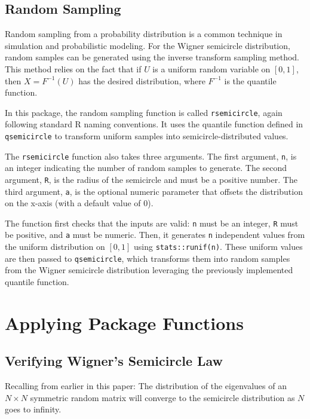\documentclass[11pt]{asaproc}
\begin{document}
\subsection{Random Sampling}

Random sampling from a probability distribution is a common technique in simulation and probabilistic modeling. For the Wigner semicircle distribution, random samples can be generated using the inverse transform sampling method. This method relies on the fact that if $U$ is a uniform random variable on $[0, 1]$, then $X = F^{-1}(U)$ has the desired distribution, where $F^{-1}$ is the quantile function.

In this package, the random sampling function is called \texttt{rsemicircle}, again following standard R naming conventions. It uses the quantile function defined in \texttt{qsemicircle} to transform uniform samples into semicircle-distributed values.

The \texttt{rsemicircle} function also takes three arguments. The first argument, \texttt{n}, is an integer indicating the number of random samples to generate. The second argument, \texttt{R}, is the radius of the semicircle and must be a positive number. The third argument, \texttt{a}, is the optional numeric parameter that offsets the distribution on the x-axis (with a default value of 0).

The function first checks that the inputs are valid: \texttt{n} must be an integer, \texttt{R} must be positive, and \texttt{a} must be numeric. Then, it generates \texttt{n} independent values from the uniform distribution on $[0, 1]$ using \texttt{stats::runif(n)}. These uniform values are then passed to \texttt{qsemicircle}, which transforms them into random samples from the Wigner semicircle distribution leveraging the previously implemented quantile function.





\section{Applying Package Functions}
\label{Application}

\subsection{Verifying Wigner's Semicircle Law}

Recalling from earlier in this paper: The distribution of the eigenvalues of an $N \times N$ symmetric random matrix will converge to the semicircle distribution as $N$ goes to infinity.
\end{document}
